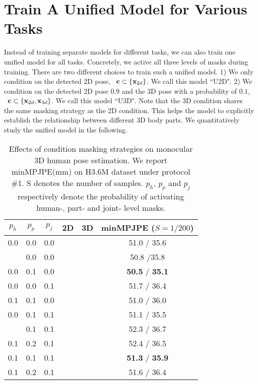 \documentclass[10pt,twocolumn,letterpaper]{article}
\newcommand{\cmark}{\ding{51}}\newcommand{\xmark}{\ding{55}}
\begin{document}
\section{Train A Unified Model for Various Tasks}
Instead of training separate models for different tasks, we can also train one unified model for all tasks. Concretely, we active all three levels of masks during training. There are two different choices to train such a unified model. 1) We only condition on the detected 2D pose, \ie \ $\mathbf{c} \subset \{ \mathbf{x}_{2d} \} $. We call this model ``U2D". 2) We condition on the detected 2D pose $0.9$ and the 3D pose with a probability of $0.1$, \ie \ $\mathbf{c} \subset \{ \mathbf{x}_{2d}, \mathbf{x}_{3d} \} $. We call this model ``U3D". Note that the 3D condition shares the same masking strategy as the 2D condition. This helps the model to explicitly establish the relationship between different 3D body parts. We quantitatively study the unified model in the following.

\begin{table}[t]
    \centering
    \small
\begin{tabular}{c c c c c c}
            \toprule
            $p_h$ & $p_p$ & $p_j$ & 2D & 3D & minMPJPE ($S=1 / 200$) \\
            \midrule
            0.0 & 0.0 & 0.0 & \cmark & \xmark & 51.0 / 35.6  \\
            \hdashline
            0.1 & 0.0 & 0.0 & \cmark & \xmark & 50.8 /35.8   \\
            0.0 & 0.1 & 0.0 & \cmark & \xmark & \textbf{50.5} / \textbf{35.1} \\
            0.0 & 0.0 & 0.1 & \cmark & \xmark & 51.7 / 36.4 \\
            0.1 & 0.1 & 0.0 & \cmark & \xmark & 51.0 / 36.0 \\
            0.0 & 0.1 & 0.1 & \cmark & \xmark & 51.1 / 35.5 \\
            \hdashline
            0.1 & 0.1 & 0.1 & \cmark & \xmark & 52.3 / 36.7 \\
            0.1 & 0.2 & 0.1 & \cmark & \xmark & 52.4 / 36.5 \\
            0.1 & 0.1 & 0.1 & \cmark & \cmark & \textbf{51.3} / \textbf{35.9}  \\
            0.1 & 0.2 & 0.1 & \cmark & \cmark & 51.6 / 36.4  \\
            \bottomrule
        \end{tabular}
\caption{Effects of condition masking strategies on monocular 3D human pose estimation. We report minMPJPE(mm) on H3.6M dataset under protocol \#1. S denotes the number of samples. $p_h$, $p_p$ and $p_j$ respectively denote the probability of activating human-, part- and joint- level masks.}
    \label{table:supp_cond_masking}
\end{table}
\end{document}
